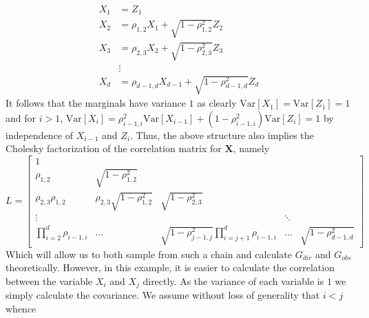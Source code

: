 \documentclass[../Thesis.tex]{subfiles}
\begin{document}
\begin{equation}\label{eq:Gaussian chain def}
    \begin{split}
        X_1 & = Z_1                                                      \\
        X_2 & = \rho_{1,2} X_1 + \sqrt{1 - \rho_{1,2}^2} Z_2             \\
        X_3 & = \rho_{2,3} X_2 + \sqrt{1 - \rho_{2,3}^2} Z_3             \\
            & \vdots                                                     \\
        X_d & = \rho_{d-1, d} X_{d-1} + \sqrt{1 - \rho_{d-1, d}^2} Z_{d}
    \end{split}
\end{equation}
It follows that the marginals have variance $1$ as clearly $\text{Var} \left[X_1\right] = \text{Var}\left[Z_1\right] = 1$ and for $i > 1$, $\text{Var}\left[X_i\right] = \rho_{i-1,i}^2 \text{Var}\left[X_{i-1}\right] + \left(1 - \rho_{i-1,i}^2\right) \text{Var} \left[Z_i\right] = 1$ by independence of $X_{i-1}$ and $Z_i$. Thus, the above structure also implies the Cholesky factorization of the correlation matrix for $\boldsymbol X$, namely
$$L = \begin{bmatrix}
        1                          &                                   &                                                        &        &                          \\
        \rho_{1,2}                 & \sqrt{1 - \rho_{1,2}^2}           &                                                        &        &                          \\
        \rho_{2,3}\rho_{1,2}       & \rho_{2,3}\sqrt{1 - \rho_{1,2}^2} & \sqrt{1 - \rho_{2,3}^2}                                &        &                          \\
        \vdots                     &                                   &                                                        & \ddots &                          \\
        \prod_{i=2}^d \rho_{i-1,i} & \dots                             & \sqrt{1 - \rho_{j-1,j}^2} \prod_{i=j+1}^d \rho_{i-1,i} & \dots  & \sqrt{1- \rho_{d-1,d}^2}
    \end{bmatrix}$$
Which will allow us to both sample from such a chain and calculate $G_{dir}$ and $G_{obs}$ theoretically. However, in this example, it is easier to calculate the correlation between the variable $X_i$ and $X_j$ directly. As the variance of each variable is $1$ we simply calculate the covariance. We assume without loss of generality that $i < j$ whence
\end{document}
